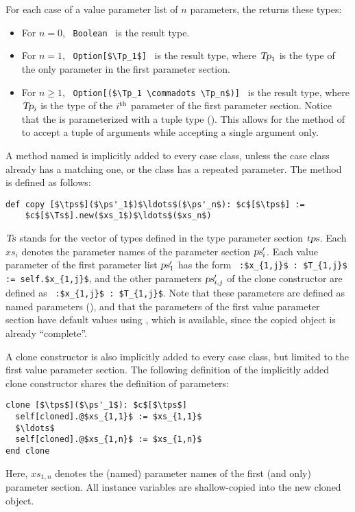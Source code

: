 For each case of a value parameter list of $n$ parameters, the  returns these types: 
\begin{itemize}
\item
For $n = 0$, ~\lstinline!Boolean!~ is the result type. 

\item
For $n = 1$, ~\lstinline!Option[$\Tp_1$]!~ is the result type, where $\mbox{\sl Tp}_1$ is the type of the only parameter in the first parameter section. 

\item
For $n \geq 1$, ~\lstinline!Option[($\Tp_1 \commadots \Tp_n$)]!~ is the result type, where $\mbox{\sl Tp}_i$ is the type of the $i^{\mbox{\scriptsize th}}$ parameter of the first parameter section. Notice that the  is parameterized with a tuple type (). This allows for the  method of  to accept a tuple of arguments while accepting a single argument only. 
\end{itemize}

A method named  is implicitly added to every case class, unless the case class already has a matching one, or the class has a repeated parameter. The method is defined as follows:
\begin{lstlisting}
def copy [$\tps$]($\ps'_1$)$\ldots$($\ps'_n$): $c$[$\tps$] :=
    $c$[$\Ts$].new($xs_1$)$\ldots$($xs_n$)
\end{lstlisting}
$\mbox{\sl Ts}$ stands for the vector of types defined in the type parameter section $\mbox{\sl tps}$. Each $xs_i$ denotes the parameter names of the parameter section $\mbox{\sl ps}'_i$.  Each value parameter of the first parameter list $\mbox{\sl ps}'_1$ has the form ~\lstinline!:$x_{1,j}$ : $T_{1,j}$ := self.$x_{1,j}$!, and the other parameters $\mbox{\sl ps}'_{i,j}$ of the clone constructor are defined as ~\lstinline!:$x_{1,j}$ : $T_{1,j}$!. Note that these parameters are defined as named parameters (), and that the parameters of the first value parameter section have default values using , which is available, since the copied object is already ``complete''. 

A clone constructor is also implicitly added to every case class, but limited to the first value parameter section. The following definition of the implicitly added clone constructor shares the definition of parameters: 
\begin{lstlisting}
clone [$\tps$]($\ps'_1$): $c$[$\tps$]
  self[cloned].@$xs_{1,1}$ := $xs_{1,1}$
  $\ldots$
  self[cloned].@$xs_{1,n}$ := $xs_{1,n}$
end clone
\end{lstlisting}
Here, $xs_{1,n}$ denotes the (named) parameter names of the first (and only) parameter section. All instance variables are shallow-copied into the new cloned object. 

